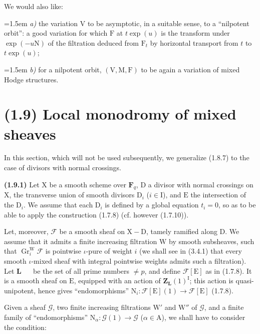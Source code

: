\documentclass[11pt,leqno]{article}
\newcommand{\Page}[1]{\ifvmode\noindent\else\unskip\ \fi{\footnotesize\textcolor{gray}{[p.\,#1]}}\ \ignorespaces}
\begin{document}
We would also like:

\noindent\hangindent=1.5em
\textit{a)} the variation \(\mathrm{V}\) to be asymptotic, in a suitable sense, to a “nilpotent orbit”: a good variation for which \(\mathrm{F}\) at \(t\exp(u)\) is the transform under \(\exp(-u\mathrm{N})\) of the filtration deduced from \(\mathrm{F}_t\) by horizontal transport from \(t\) to \(t\exp(u)\);

\noindent\hangindent=1.5em
\textit{b)} for a nilpotent orbit, \((\mathrm{V},\mathrm{M},\mathrm{F})\) to be again a variation of mixed Hodge structures.

\section*{(1.9) Local monodromy of mixed sheaves}

In this section, which will not be used subsequently, we generalize (1.8.7) to the case of divisors with normal crossings.

\textbf{(1.9.1)} Let \(\mathrm{X}\) be a smooth scheme over \(\mathbf{F}_q\), \(\mathrm{D}\) a divisor with normal crossings on \(\mathrm{X}\), the transverse union of smooth divisors \(\mathrm{D}_i\) (\(i\in\mathrm{I}\)), and \(\mathrm{E}\) the intersection of the \(\mathrm{D}_i\). We assume that each \(\mathrm{D}_i\) is defined by a global equation \(t_i=0\), so as to be able to apply the construction (1.7.8) (cf. however (1.7.10)).

Let, moreover, \(\mathscr{F}\) be a smooth sheaf on \(\mathrm{X}-\mathrm{D}\), tamely ramified along \(\mathrm{D}\). We assume that it admits a finite increasing filtration \(\mathrm{W}\) by smooth subsheaves, such that \(\operatorname{Gr}_i^{\mathrm{W}}\mathscr{F}\) is pointwise \(\iota\)-pure of weight \(i\) (we shall see in (3.4.1) that every smooth \(\iota\)-mixed sheaf with integral pointwise weights admits such a filtration). Let \(\mathbf{L}\)
\Page{180}
be the set of all prime numbers \(\neq p\), and define \(\mathscr{F}[\mathrm{E}]\) as in (1.7.8). It is a smooth sheaf on \(\mathrm{E}\), equipped with an action of \(\mathbf{Z}_{\mathbf{L}}(1)^{\mathrm{I}}\); this action is quasi-unipotent, hence gives “endomorphisms” \(\mathrm{N}_i:\mathscr{F}[\mathrm{E}](1)\to\mathscr{F}[\mathrm{E}]\) (1.7.8).

Given a sheaf \(\mathscr{G}\), two finite increasing filtrations \(\mathrm{W}'\) and \(\mathrm{W}''\) of \(\mathscr{G}\), and a finite family of “endomorphisms” \(\mathrm{N}_\alpha:\mathscr{G}(1)\to\mathscr{G}\) (\(\alpha\in\mathrm{A}\)), we shall have to consider the condition:
\end{document}
